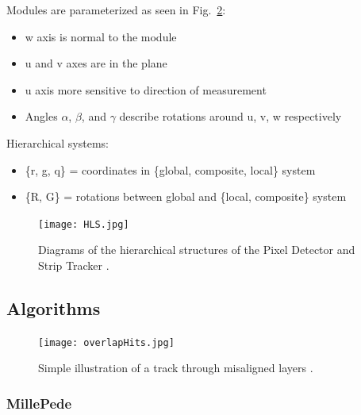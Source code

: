 Modules are parameterized as seen in Fig.~\ref{fig:overlapHits}:
\begin{itemize}
    \item w axis is normal to the module
    \item u and v axes are in the plane
    \item u axis more sensitive to direction of measurement
    \item Angles $\alpha$, $\beta$, and $\gamma$ describe rotations around u, v, w respectively
\end{itemize}

Hierarchical systems:
\begin{itemize}
    \item \{r, g, q\} = coordinates in \{global, composite, local\} system
    \item \{R, G\} = rotations between global and \{local, composite\} system
\end{itemize}

\begin{figure}[!htb]
    \begin{center}
        \texttt{[image: HLS.jpg]}
        \caption{Diagrams of the hierarchical structures of the Pixel Detector and Strip Tracker \cite{WAdam_2009}.}
        \label{fig:HLS}
    \end{center}
\end{figure}

\subsection{Algorithms}

\begin{figure}[!htb]
    \begin{center}
        \texttt{[image: overlapHits.jpg]}
        \caption{Simple illustration of a track through misaligned layers \cite{2022166795}.}
        \label{fig:overlapHits}
    \end{center}
\end{figure}

\subsubsection{MillePede}


